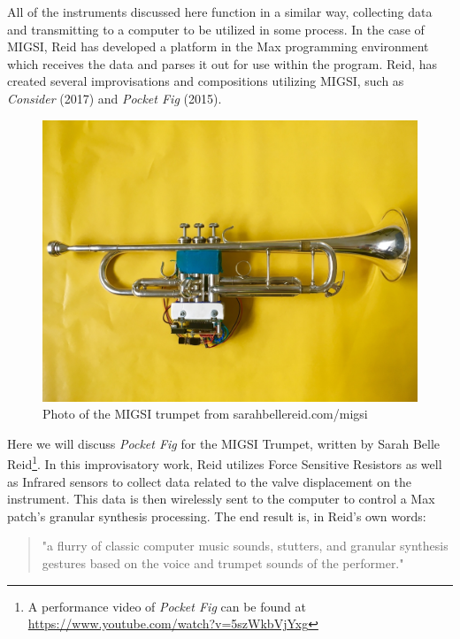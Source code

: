 All of the instruments discussed here function in a similar way, collecting data and transmitting to a computer to be utilized in some process. In the case of MIGSI, Reid has developed a platform in the Max programming environment which receives the data and parses it out for use within the program\cite{reid_2019}. Reid, has created several improvisations and compositions utilizing MIGSI, such as \textit{Consider} (2017) and \textit{Pocket Fig} (2015).

\begin{figure}
    \centering
    \includegraphics[scale=0.25]{diagrams/MIGSI.jpg}
    \caption{Photo of the MIGSI trumpet from sarahbellereid.com/migsi}
    \label{fig:MIGSI} %
\end{figure}


Here we will discuss \textit{Pocket Fig} for the MIGSI Trumpet, written by Sarah Belle Reid\footnote{A performance video of \textit{Pocket Fig} can be found at \url{https://www.youtube.com/watch?v=5szWkbVjYxg}}. In this improvisatory work, Reid utilizes Force Sensitive Resistors as well as Infrared sensors to collect data related to the valve displacement on the instrument. This data is then wirelessly sent to the computer to control a Max patch's granular synthesis processing. The end result is, in Reid's own words: 

\begin{quote}
    "a flurry of classic computer music sounds, stutters, and granular synthesis gestures based on the voice and trumpet sounds of the performer."
\end{quote}

